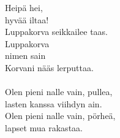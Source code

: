 
Heipä hei, \\ hyvää iltaa! \\ Luppakorva seikkailee taas. \\ Luppakorva \\ nimen sain \\ Korvani nääs lerputtaa. \\ \hspace{10mm} \\ Olen pieni nalle vain, pullea, \\ lasten kanssa viihdyn ain. \\ Olen pieni nalle vain, pörheä, \\ lapset mua rakastaa.